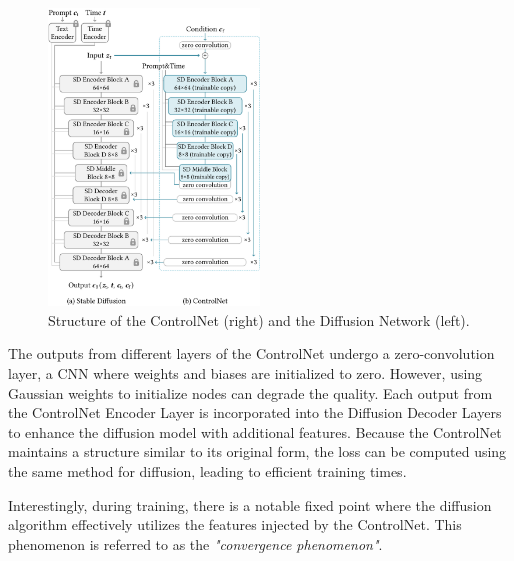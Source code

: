 \begin{figure}[H]
  \centering
  \includegraphics[width=0.5\textwidth]{figures/background/controlnet.pdf}
  \caption{Structure of the ControlNet (right) and the Diffusion Network (left). \cite{zhang2023addingconditionalcontroltexttoimage}}
  \label{fig:controlnet}
  \clearpage
\end{figure}

The outputs from different layers of the ControlNet undergo a zero-convolution layer, a CNN where weights and biases are initialized to zero. However, using Gaussian weights to initialize nodes can degrade the quality. Each output from the ControlNet Encoder Layer is incorporated into the Diffusion Decoder Layers to enhance the diffusion model with additional features. Because the ControlNet maintains a structure similar to its original form, the loss can be computed using the same method for diffusion, leading to efficient training times.

Interestingly, during training, there is a notable fixed point where the diffusion algorithm effectively utilizes the features injected by the ControlNet. This phenomenon is referred to as the \textit{"convergence phenomenon"}.\cite{zhang2023addingconditionalcontroltexttoimage}